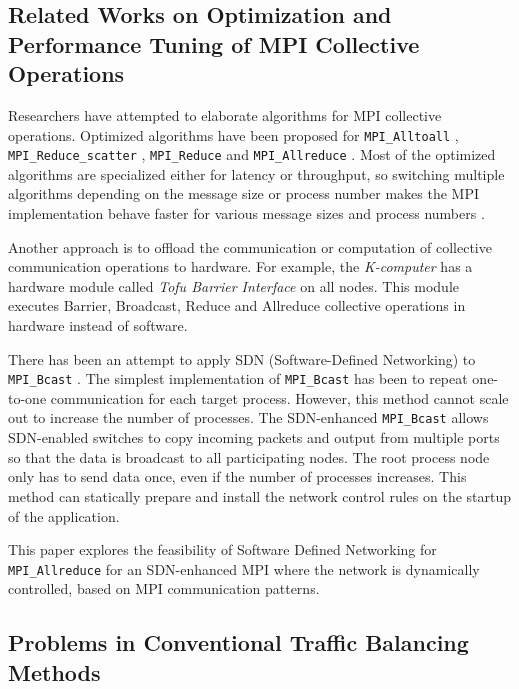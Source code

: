 \hypertarget{related-works-on-optimization-and-performance-tuning-of-mpi-collective-operations}{%
\subsection{Related Works on Optimization and Performance Tuning of MPI
Collective
Operations}\label{related-works-on-optimization-and-performance-tuning-of-mpi-collective-operations}}

Researchers have attempted to elaborate algorithms for MPI collective
operations. Optimized algorithms have been proposed for
\texttt{MPI\_Alltoall} \cite{Bruck1997}, \texttt{MPI\_Reduce\_scatter}
\cite{Iannello1997}, \texttt{MPI\_Reduce} and \texttt{MPI\_Allreduce}
\cite{Rabenseifner1997}. Most of the optimized algorithms are
specialized either for latency or throughput, so switching multiple
algorithms depending on the message size or process number makes the MPI
implementation behave faster for various message sizes and process
numbers \cite{Thakur2005}.

Another approach is to offload the communication or computation of
collective communication operations to hardware. For example, the
\emph{K-computer} \cite{Yokokawa2011} has a hardware module called
\emph{Tofu Barrier Interface} \cite{Ajima2012} on all nodes. This module
executes Barrier, Broadcast, Reduce and Allreduce collective operations
in hardware instead of software.

There has been an attempt to apply SDN (Software-Defined Networking) to
\texttt{MPI\_Bcast} \cite{Dashdavaa2013}. The simplest implementation of
\texttt{MPI\_Bcast} has been to repeat one-to-one communication for each
target process. However, this method cannot scale out to increase the
number of processes. The SDN-enhanced \texttt{MPI\_Bcast} allows
SDN-enabled switches to copy incoming packets and output from multiple
ports so that the data is broadcast to all participating nodes. The root
process node only has to send data once, even if the number of processes
increases. This method can statically prepare and install the network
control rules on the startup of the application.

This paper explores the feasibility of Software Defined Networking for
\texttt{MPI\_Allreduce} for an SDN-enhanced MPI where the network is
dynamically controlled, based on MPI communication patterns.

\hypertarget{problems-in-conventional-traffic-balancing-methods}{%
\subsection{Problems in Conventional Traffic Balancing
Methods}\label{problems-in-conventional-traffic-balancing-methods}}

